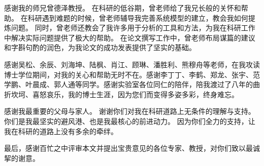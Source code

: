 \documentclass[format=draft,language=chinese,degree=phd,table,usenames,dvipsnames]{hustthesis}
\begin{document}
\begin{ack}
感谢我的师兄曾德泽教授。
在科研的低谷期，曾老师给了我兄长般的关怀和帮助。
在科研遇到难题的时候，曾老师辅导我完善系统模型的建立，教会我如何提炼问题。
同时，曾老师还教会了我许多用于分析的工具和方法，为我在科研工作中解决实际问题提供了极大的帮助。
在论文撰写工作中，曾老师布局谋篇的建议和字斟句酌的润色，为我论文的成功发表提供了坚实的基础。

感谢吴松、余辰、刘海坤、陆枫、肖江、顾琳、潘胜利、熊穆舟等老师，在我攻读博士学位期间，对我的关心和帮助无时不在。感谢李丁丁、李鹤、郑龙、张宇、范学鹏、叶晨成、郭人通等同学。感谢实验室各位同仁的陪伴，陪我渡过了八年的曲折坎坷、喜怒哀乐，我的博士生涯，因为您们而变得多姿多彩，终身难忘。

感谢我最重要的父母与家人。
谢谢你们对我在科研道路上无条件的理解与支持。
你们是我最坚实的避风港、也是我最核心的前进动力。
因为你们全力的支持，让我在科研的道路上没有多余的牵绊。

最后，感谢百忙之中评审本文并提出宝贵意见的各位专家、教授，对你们致以最诚挈的谢意。


\end{ack}



\appendix
\end{document}

